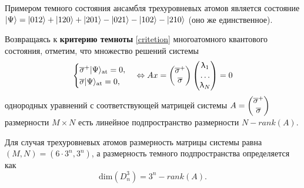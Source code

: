 \clearpage
\indent Примером темного состояния ансамбля трехуровневых атомов является состояние
$|\Psi\rangle = |012\rangle + |120\rangle + |201\rangle - |021\rangle - |102\rangle - |210\rangle$ (оно же единственное).

Возвращаясь к \textbf{критерию темноты} \eqref{critetion} многоатомного квантового состояния, отметим, что множество решений системы
\begin{equation}\label{slae}
	\begin{cases}
		\overline{\sigma}^{+}|\Psi\rangle_{\text{at}} = 0,\\
		\overline{\sigma}|\Psi\rangle_{\text{at}} = 0,
	\end{cases} \Leftrightarrow
	Ax =
	\begin{pmatrix}
		\overline{\sigma}^{+}\\
		\overline{\sigma}
	\end{pmatrix}
	\begin{pmatrix}
		\uplambda_1\\
		\dots\\
		\uplambda_N\\
	\end{pmatrix} = 0
\end{equation}
однородных уравнений с соответствующей матрицей системы
$
A=\begin{pmatrix}
	\overline{\sigma}^{+}\\
	\overline{\sigma}
\end{pmatrix}
$ размерности $M \times N$ есть линейное подпространство размерности $N -
rank(A)$. 

Для случая трехуровневых атомов размерность матрицы системы равна $(M, N) = (6 \cdot 3^{n}, 3^{n})$, а размерность темного подпространства определяется как
\begin{equation}\label{dim_3_level}
\mathrm{dim}(D_{n}^{3}) = 3^{n} - rank(A).
\end{equation}

